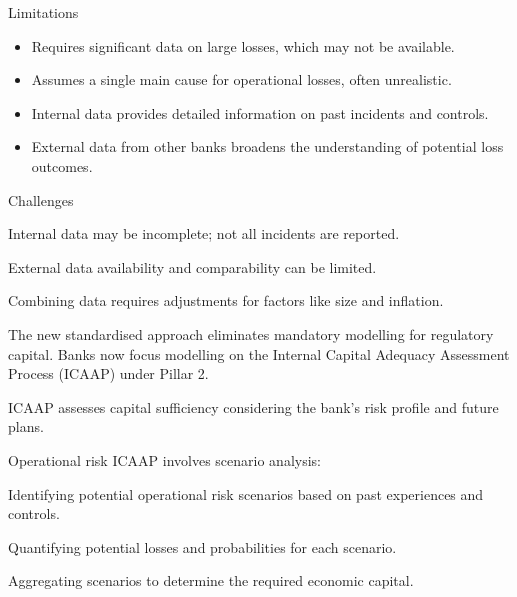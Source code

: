 \begin{ornotebox}{Limitations}
\begin{itemize}
\item Requires significant data on large losses, which may not be available.
\item Assumes a single main cause for operational losses, often unrealistic.
\end{itemize}
\end{ornotebox}


\begin{itemize}
\item Internal data provides detailed information on past incidents and controls.
\item External data from other banks broadens the understanding of potential loss
outcomes.
\end{itemize}

\begin{ornotebox}{Challenges}
\begin{checks}
\item Internal data may be incomplete; not all incidents are reported.
\item External data availability and comparability can be limited.
\item Combining data requires adjustments for factors like size and inflation.
\end{checks}
\end{ornotebox}


\begin{lettered}
\item The new standardised approach eliminates mandatory modelling for regulatory
capital. Banks now focus modelling on the Internal Capital Adequacy Assessment
Process (ICAAP) under Pillar 2.
\item ICAAP assesses capital sufficiency considering the bank's risk profile and
future plans.
\end{lettered}

Operational risk ICAAP involves scenario analysis:

\begin{checks}
\item Identifying potential operational risk scenarios based on past experiences
and controls.
\item Quantifying potential losses and probabilities for each scenario.
\item Aggregating scenarios to determine the required economic capital.
\end{checks}

